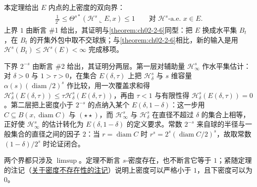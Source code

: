 \documentclass[../../main.tex]{subfiles}%
\begin{document}
\begin{remark}\label{remark:ch02-thm-2-7-动机}
本定理给出 $E$ 内点的上密度的双向界：
\begin{align*}
\frac{1}{2^s}\leqslant\Theta^{s*}(\mathcal{H}^s\llcorner E,x)\leqslant1\qquad\text{对 }\mathcal{H}^s\text{-a.e. }x\in E .
\end{align*}
上界 $1$ 由断言 \#1 给出，其证明与\cref{theorem:ch02-2-6}同型：把 $E$ 换成水平集 $B_t$，在 $B_t$ 的开集外包中取不交球族；与\cref{theorem:ch02-2-6}相比，新的输入是用 $\mathcal{H}^s(B_t)\leqslant\mathcal{H}^s(E)<\infty$ 完成移项。%

下界 $2^{-s}$ 由断言 \#2 给出，其证明分两层。第一层对辅助量 $\mathcal{H}^s_\infty$ 作水平集估计：对 $\delta>0$ 与 $1>\tau>0$，在集合 $E(\delta,\tau)$ 上把 $\mathcal{H}^s_\delta$ 与 $s$ 维容量 $\alpha(s)(\operatorname{diam}/2)^s$ 作比较，用一次覆盖求和得 $\mathcal{H}^s_\delta(E(\delta,\tau))\leqslant\tau\mathcal{H}^s_\delta(E(\delta,\tau))$，再由 $\tau<1$ 与有限性得 $\mathcal{H}^s_\delta(E(\delta,\tau))=0$。第二层把上密度小于 $2^{-s}$ 的点纳入某个 $E(\delta,1-\delta)$：这一步用 $C\subseteq B(x,\operatorname{diam}C)$ 与 $(\star\star)$，而 $\mathcal{H}^s_\infty$ 与 $\mathcal{H}^s_\delta$ 在直径不超过 $\delta$ 的集合上相等，正好使 $\mathcal{H}^s_\infty$ 的估计转化为 $E(\delta,1-\delta)$ 的定义要求。常数 $2^{-s}$ 来自球的半径与一般集合的直径之间的因子 $2$：当 $r=\operatorname{diam}C$ 时 $r^s=2^s(\operatorname{diam}C/2)^s$，故取常数 $(1-\delta)/2^s$ 时论证闭合。

两个界都只涉及 $\limsup$。定理不断言 $s$-密度存在，也不断言它等于 $1$；紧随定理的注记（\hyperref[remark:ch02-thm-2-7-边界]{关于密度不存在性的注记}）说明上密度可以严格小于 $1$，且下密度可以为 $0$。
\end{remark}
\end{document}

